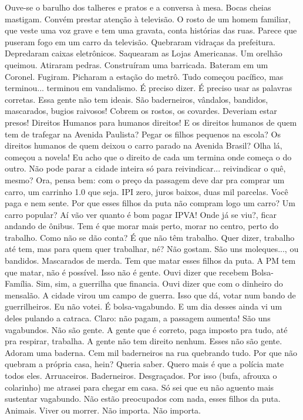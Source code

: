 Ouve-se o barulho dos talheres e pratos e a
conversa à mesa. Bocas cheias mastigam. Convém prestar atenção à
televisão. O rosto de um homem familiar, que veste uma voz grave e tem
uma gravata, conta histórias das ruas. Parece que puseram fogo em um
carro da televisão. Quebraram vidraças da prefeitura. Depredaram caixas
eletrônicos. Saquearam as Lojas Americanas. Um orelhão queimou. Atiraram
pedras. Construíram uma barricada. Bateram em um Coronel. Fugiram.
Picharam a estação do metrô. Tudo começou pacífico, mas terminou...
terminou em vandalismo. É preciso dizer. É preciso usar as palavras
corretas. Essa gente não tem ideais. São baderneiros, vândalos,
bandidos, mascarados, bugios raivosos! Cobrem os rostos, os covardes.
Deveriam estar presos! Direitos Humanos para humanos direitos! E os
direitos humanos de quem tem de trafegar na Avenida Paulista? Pegar os
filhos pequenos na escola? Os direitos humanos de quem deixou o carro
parado na Avenida Brasil? Olha lá, começou a novela! Eu acho que o
direito de cada um termina onde começa o do outro. Não pode parar a
cidade inteira só para reivindicar... reivindicar o quê, mesmo? Ora,
pensa bem: com o preço da passagem deve dar pra comprar um carro, um
carrinho 1.0 que seja. IPI zero, juros baixos, duas mil parcelas. Você
paga e nem sente. Por que esses filhos da puta não compram logo um
carro? Um carro popular? Aí vão ver quanto é bom pagar IPVA! Onde já se
viu?, ficar andando de ônibus. Tem é que morar mais perto, morar no
centro, perto do trabalho. Como não se dão conta? É que não têm
trabalho. Quer dizer, trabalho até tem, mas para quem quer trabalhar,
né? Não gostam. São uns moleques..., ou bandidos. Mascarados de merda.
Tem que matar esses filhos da puta. A PM tem que matar, não é possível.
Isso não é gente. Ouvi dizer que recebem Bolsa-Família. Sim, sim, a
guerrilha que financia. Ouvi dizer que com o dinheiro do mensalão. A
cidade virou um campo de guerra. Isso que dá, votar num bando de
guerrilheiros. Eu não votei. É bolsa-vagabundo. E um dia desses ainda vi
um deles pulando a catraca. Claro: não pagam, a passagem aumenta! São
uns vagabundos. Não são gente. A gente que é correto, paga imposto pra
tudo, até pra respirar, trabalha. A gente não tem direito nenhum. Esses
não são gente. Adoram uma baderna. Cem mil baderneiros na rua quebrando
tudo. Por que não quebram a própria casa, hein? Queria saber. Quero mais
é que a polícia mate todos eles. Arruaceiros. Baderneiros. Desgraçados.
Por isso (bufa, afrouxa o colarinho) me atrasei para chegar em casa. Só
sei que eu não aguento mais sustentar vagabundo. Não estão preocupados
com nada, esses filhos da puta. Animais. Viver ou morrer. Não importa.
Não importa.

